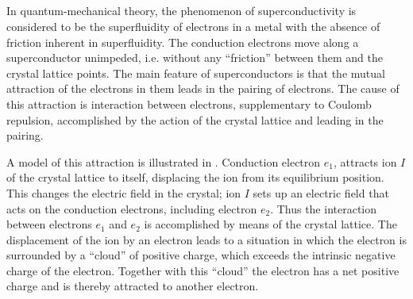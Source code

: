 \subsection{}\label{41.6.5} In quantum-mechanical theory, the phenomenon of superconductivity is considered to be the superfluidity  of electrons in a metal with the absence of friction inherent in superfluidity. The conduction electrons move along a superconductor unimpeded, i.e. without any ``friction'' between them and the crystal lattice points. The main feature of superconductors is that the mutual attraction of the electrons in them leads in the pairing of electrons. The cause of this attraction is interaction between electrons, supplementary to Coulomb repulsion, accomplished by the action of the crystal lattice and leading
in the pairing. 




A model of this attraction is illustrated in . Conduction electron $e_{1}$, attracts ion $I$ of the crystal
lattice to itself, displacing the ion from its equilibrium position. This changes the electric field in the crystal; ion $I$ sets up an electric field that acts on the conduction electrons, including electron $e_{2}$. Thus the interaction
between electrons $e_{1}$ and $e_{2}$ is accomplished by means of the crystal lattice. The displacement of the ion by an electron leads to a situation in which the electron is surrounded by a ``cloud'' of positive charge, which exceeds the intrinsic negative charge of the electron. Together with this ``cloud'' the electron has a net positive charge and is
thereby attracted to another electron.

